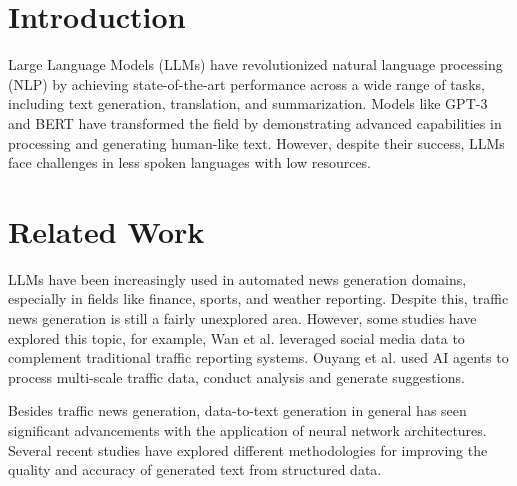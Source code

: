 \documentclass[fleqn,moreauthors,10pt]{ds_report}
\affiliation{\textit{Advisors: Slavko Žitnik}}
\begin{document}
\flushbottom 

\maketitle 

\thispagestyle{empty} 


\section*{Introduction}

Large Language Models (LLMs) have revolutionized natural language processing (NLP) by achieving state-of-the-art performance across a wide range of tasks, including text generation, translation, and summarization. Models like GPT-3 \cite{brown2020languagemodelsfewshotlearners} and BERT \cite{devlin-etal-2019-bert} have transformed the field by demonstrating advanced capabilities in processing and generating human-like text. However, despite their success, LLMs face challenges in less spoken languages with low resources.

\section*{Related Work}

LLMs have been increasingly used in automated news generation domains, especially in fields like finance, sports, and weather reporting. Despite this, traffic news generation is still a fairly unexplored area. However, some studies have explored this topic, for example, Wan et al. \cite{wan2020empoweringrealtimetraffic} leveraged social media data to complement traditional traffic reporting systems. Ouyang et al. \cite{ouyang2024trafficgptmultiscaletrafficanalysis} used AI agents to process multi-scale traffic data, conduct analysis and generate suggestions.

Besides traffic news generation, data-to-text generation in general has seen significant advancements with the application of neural network architectures. Several recent studies have explored different methodologies for improving the quality and accuracy of generated text from structured data.
\end{document}
